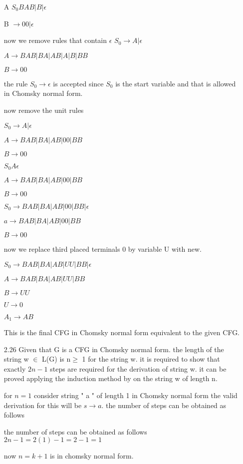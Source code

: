 \documentclass[11pt]{article}
\theoremstyle{thmstyle}
\begin{document}
\begin{itemize}
A $S_0 BAB | B | \epsilon$

B $\rightarrow 00 | \epsilon$

now we remove rules that contain $\epsilon$
$S_0 \rightarrow A | \epsilon$

$A \rightarrow BAB | BA | AB | A | B | BB$

$B \rightarrow 00$

the rule $S_0 \rightarrow \epsilon$ is accepted since $S_0$ is the start variable and that is allowed in Chomsky normal form.

now remove the unit rules

$S_0 \rightarrow A | \epsilon$

$A \rightarrow BAB | BA | AB | 00 | BB$

$B \rightarrow 00 $

$S_0 A \epsilon$

$A \rightarrow BAB | BA | AB | 00 | BB$

$B \rightarrow 00$

$S_0 \rightarrow BAB| BA | AB | 00 | BB | \epsilon$

$a \rightarrow BAB | BA | AB | 00 |BB$

$B \rightarrow 00$

now we replace third placed terminals 0 by variable U with new.

$S_0 \rightarrow BAB | BA | AB | UU | BB | \epsilon$

$A \rightarrow BAB| BA | AB | UU | BB$

$B \rightarrow UU$

$U \rightarrow 0$

$A_1 \rightarrow AB$

This is the final CFG in Chomsky normal form equivalent to the given CFG.

\item[2.26]
Given that G is a CFG in Chomsky normal form. the length of the string w $\in$ L(G) is n$ \geq$ 1 for the string w. it is required to show that exactly $2n-1$ steps are required for the derivation of string w. it can be proved applying the induction method by on the string w of length n.

for $n = 1$ consider string " a " of length 1 in Chomsky normal form the valid derivation for this will be $s \rightarrow a$. the number of steps can be obtained as follows 

the number of steps can be obtained as follows 
$2n - 1 = 2(1)-1 = 2-1 = 1$

now $n = k+1 $ is in chomsky normal form.


\end{itemize}
\end{document}
